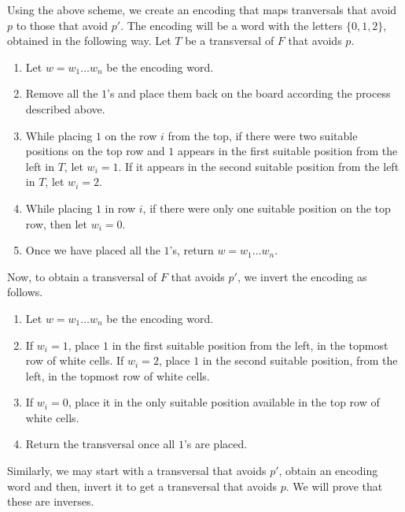 \documentclass[12pt, english, a4paper]{article}
\theoremstyle{plain}
\theoremstyle{definition}
\theoremstyle{remark}
\begin{document}
Using the above scheme, we create an encoding that maps tranversals that avoid $p$ to those that avoid $p'$. The encoding will be a word with the letters $\{0,1,2\}$, obtained in the following way. Let $T$ be a transversal of $F$ that avoids $p$. 
\begin{enumerate}
     \item Let $w=w_1\dots w_n$ be the encoding word.
    \item Remove all the $1$'s and place them back on the board according the process described above.
    \item While placing $1$ on the row $i$ from the top, if there were two suitable positions on the top row and $1$ appears in the first suitable position from the left in $T$, let $w_i=1$. If it appears in the second suitable position from the left in $T$, let $w_i=2$.
    \item While placing $1$ in row $i$, if there were only one suitable position on the top row, then let $w_i=0$.
    \item Once we have placed all the $1$'s, return $w=w_1\dots w_n$.
\end{enumerate}

Now, to obtain a transversal of $F$ that avoids $p'$, we invert the encoding as follows.
\begin{enumerate}
    \item Let $w=w_1\dots w_n$ be the encoding word.
    \item If $w_i=1$, place $1$ in the first suitable position from the left, in the topmost row of white cells. If $w_i=2$, place $1$ in the second suitable position, from the left, in the topmost row of white cells.
    \item If $w_i=0$, place it in the only suitable position available in the top row of white cells.
    \item Return the transversal once all $1$'s are placed.
\end{enumerate}

Similarly, we may start with a transversal that avoids $p'$, obtain an encoding word and then, invert it to get a transversal that avoids $p$. We will prove that these are inverses.
\end{document}
